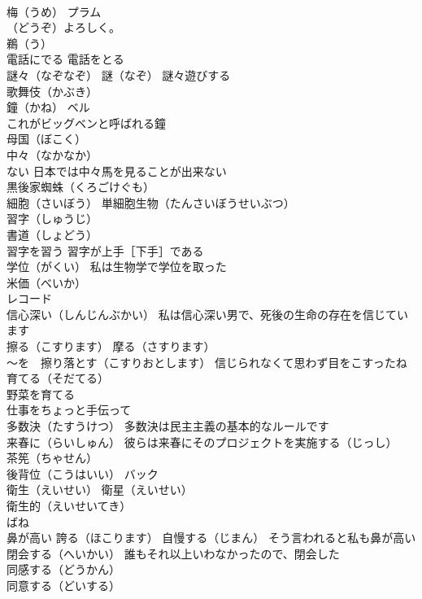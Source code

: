 \documentclass[8pt]{extreport}
\begin{document}
\begin{CJK}{UTF8}{min}
\\	梅（うめ） プラム
\\	（どうぞ）よろしく。
\\	鵜（う）
\\	電話にでる 電話をとる
\\	謎々（なぞなぞ） 謎（なぞ） 謎々遊びする
\\	歌舞伎（かぶき）
\\	鐘（かね） ベル 
\\	これがビッグベンと呼ばれる鐘
\\	母国（ぼこく）
\\	中々（なかなか）
\\	ない 日本では中々馬を見ることが出来ない
\\	黒後家蜘蛛（くろごけぐも）
\\	細胞（さいぼう） 単細胞生物（たんさいぼうせいぶつ）
\\	習字（しゅうじ）
\\	書道（しょどう）
\\	習字を習う 習字が上手［下手］である
\\	学位（がくい） 私は生物学で学位を取った
\\	米価（べいか）
\\	レコード
\\	信心深い（しんじんぶかい） 私は信心深い男で、死後の生命の存在を信じています
\\	擦る（こすります） 摩る（さすります）
\\	～を　擦り落とす（こすりおとします） 信じられなくて思わず目をこすったね
\\	育てる（そだてる） 
\\	野菜を育てる
\\	仕事をちょっと手伝って
\\	多数決（たすうけつ） 多数決は民主主義の基本的なルールです
\\	来春に（らいしゅん） 彼らは来春にそのプロジェクトを実施する（じっし）
\\	茶筅（ちゃせん）
\\	後背位（こうはいい） バック
\\	衛生（えいせい） 衛星（えいせい）
\\	衛生的（えいせいてき）
\\	ばね
\\	鼻が高い 誇る（ほこります） 自慢する（じまん） そう言われると私も鼻が高い
\\	閉会する（へいかい） 誰もそれ以上いわなかったので、閉会した
\\	同感する（どうかん）
\\	同意する（どいする）

\end{CJK}
\end{document}
